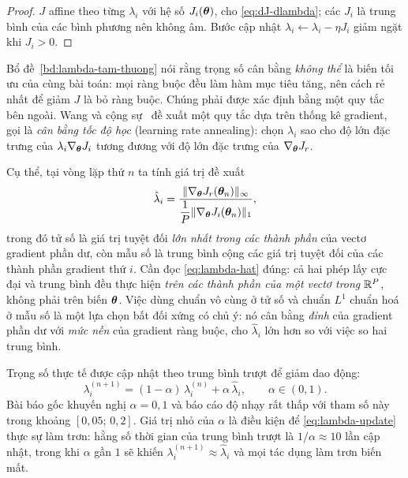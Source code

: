 \begin{proof}
$J$ affine theo từng $\lambda_i$ với hệ số $J_i(\bm{\theta})$, cho
\eqref{eq:dJ-dlambda}; các $J_i$ là trung bình của các bình phương nên không âm.
Bước cập nhật $\lambda_i \gets \lambda_i - \eta J_i$ giảm ngặt khi $J_i > 0$.
\end{proof}
 
Bổ đề~\ref{bd:lambda-tam-thuong} nói rằng trọng số cân bằng \emph{không thể} là
biến tối ưu của cùng bài toán: mọi ràng buộc đều làm hàm mục tiêu tăng, nên cách
rẻ nhất để giảm $J$ là bỏ ràng buộc. Chúng phải được xác định bằng một quy tắc
bên ngoài. Wang và cộng sự~\cite{wang2021} đề xuất một quy tắc dựa trên thống kê
gradient, gọi là \emph{cân bằng tốc độ học} (learning rate annealing): chọn
$\lambda_{i}$ sao cho độ lớn đặc trưng của $\lambda_{i}\nabla_{\bm{\theta}} J_{i}$
tương đương với độ lớn đặc trưng của $\nabla_{\bm{\theta}} J_{r}$.
 
Cụ thể, tại vòng lặp thứ $n$ ta tính giá trị đề xuất
\begin{equation}
\hat{\lambda}_{i}
= \frac{\lVert\nabla_{\bm{\theta}} J_{r}(\bm{\theta}_{n})\rVert_{\infty}}
       {\dfrac{1}{P}\lVert\nabla_{\bm{\theta}} J_{i}(\bm{\theta}_{n})\rVert_{1}} ,
\label{eq:lambda-hat}
\end{equation}
trong đó tử số là giá trị tuyệt đối \emph{lớn nhất trong các thành phần} của
vectơ gradient phần dư, còn mẫu số là trung bình cộng các giá trị tuyệt đối của
các thành phần gradient thứ $i$. Cần đọc \eqref{eq:lambda-hat} đúng: cả hai phép
lấy cực đại và trung bình đều thực hiện \emph{trên các thành phần của một vectơ
trong $\mathbb{R}^P$}, không phải trên biến $\bm{\theta}$. Việc dùng chuẩn vô cùng ở tử số và
chuẩn $L^1$ chuẩn hoá ở mẫu số là một lựa chọn bất đối xứng có chủ ý: nó cân bằng
\emph{đỉnh} của gradient phần dư với \emph{mức nền} của gradient ràng buộc, cho
$\hat\lambda_i$ lớn hơn so với việc so hai trung bình.
 
Trọng số thực tế được cập nhật theo trung bình trượt để giảm dao động:
\begin{equation}
\lambda_{i}^{(n+1)}
= (1-\alpha)\, \lambda_{i}^{(n)}
+ \alpha\, \hat{\lambda}_{i},
\qquad \alpha \in (0,1).
\label{eq:lambda-update}
\end{equation}
Bài báo gốc khuyến nghị $\alpha = 0{,}1$ và báo cáo độ nhạy rất thấp với tham số
này trong khoảng $[0{,}05;\,0{,}2]$. Giá trị nhỏ của $\alpha$ là điều kiện để
\eqref{eq:lambda-update} thực sự làm trơn: hằng số thời gian của trung bình trượt
là $1/\alpha \approx 10$ lần cập nhật, trong khi $\alpha$ gần $1$ sẽ khiến
$\lambda_i^{(n+1)} \approx \hat\lambda_i$ và mọi tác dụng làm trơn biến mất.
 
